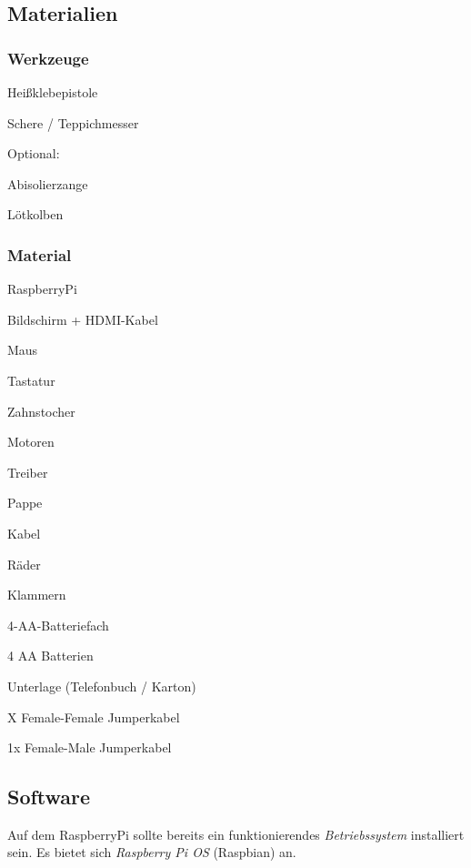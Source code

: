 \subsection{Materialien}

\subsubsection{Werkzeuge}
\begin{checklist}
    \item Heißklebepistole
    \item Schere / Teppichmesser

    \begin{checklist}
    \item[] Optional:
    \item Abisolierzange
    \item Lötkolben
    \end{checklist}
\end{checklist}

\subsubsection{Material}
\begin{checklist}
    \item RaspberryPi
    \item Bildschirm + HDMI-Kabel
    \item Maus
    \item Tastatur
    \item Zahnstocher
    \item Motoren
    \item Treiber
    \item Pappe
    \item Kabel
    \item Räder
    \item Klammern
    \item 4-AA-Batteriefach
    \item 4 AA Batterien
    \item Unterlage (Telefonbuch / Karton)
    \item X Female-Female Jumperkabel
    \item 1x Female-Male Jumperkabel
\end{checklist}


\subsection{Software}
Auf dem RaspberryPi sollte bereits ein funktionierendes \emph{Betriebssystem} installiert sein. Es bietet sich \emph{Raspberry Pi OS} (Raspbian) an. \\

